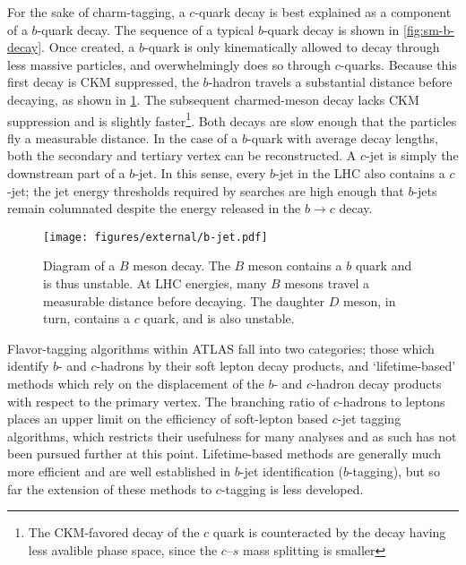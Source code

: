 For the sake of charm-tagging, a $c$-quark decay is best explained as a component of a $b$-quark decay.
The sequence of a typical $b$-quark decay is shown in \cref{fig:sm-b-decay}.
Once created, a $b$-quark is only kinematically allowed to decay through less massive particles, and overwhelmingly does so through $c$-quarks.
Because this first decay is CKM suppressed, the $b$-hadron travels a substantial distance before decaying, as shown in \cref{fig:b-jet}.
The subsequent charmed-meson decay lacks CKM suppression and is slightly faster\footnote{The CKM-favored decay of the $c$ quark is counteracted by the decay having less avalible phase space, since the $c$--$s$ mass splitting is smaller}.
Both decays are slow enough that the particles fly a measurable distance.
In the case of a $b$-quark with average decay lengths, both the secondary and tertiary vertex can be reconstructed.
A $c$-jet is simply the downstream part of a $b$-jet.
In this sense, every $b$-jet in the LHC also contains a $c$-jet; the jet energy thresholds required by searches are high enough that $b$-jets remain columnated despite the energy released in the $b \to c$ decay.

\begin{figure}
  \begin{center}
    \texttt{[image: figures/external/b-jet.pdf]}
    \caption[Diagram of a $B$-meson decay.]{Diagram of a $B$ meson decay. The $B$ meson contains a $b$ quark and is thus unstable. At LHC energies, many $B$ mesons travel a measurable distance before decaying. The daughter $D$ meson, in turn, contains a $c$ quark, and is also unstable.}
    \label{fig:b-jet}
  \end{center}
\end{figure}

Flavor-tagging algorithms within ATLAS fall into two categories; those which identify $b$- and $c$-hadrons by their soft lepton decay products, and `lifetime-based' methods which rely on the displacement of the $b$- and $c$-hadron decay products with respect to the primary vertex.
The branching ratio of $c$-hadrons to leptons places an upper limit on the efficiency of soft-lepton based $c$-jet tagging algorithms, which restricts their usefulness for many analyses and as such has not been pursued further at this point.
Lifetime-based methods are generally much more efficient and are well established in $b$-jet identification ($b$-tagging), but so far the extension of these methods to $c$-tagging is less developed.


